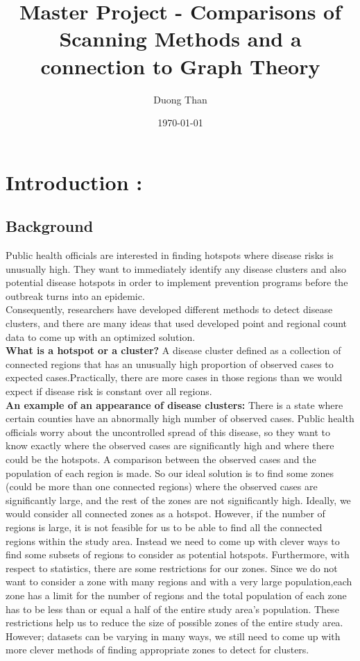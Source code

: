\documentclass[12pt]{article}
\title{Master Project - Comparisons of Scanning Methods and a connection to Graph Theory  }
\author{Duong Than}
\date{\today}
\begin{document}
\maketitle	
	
		\section{Introduction :} 
		\subsection{Background} 

			Public health officials are interested in finding hotspots where disease risks is unusually high. They want to immediately identify any disease clusters and also potential disease hotspots in order to implement prevention programs before the outbreak turns into an epidemic. \\ 		
			
			Consequently, researchers have developed different methods to detect disease clusters, and there are many ideas that used developed point and regional count data to come up with an optimized solution. \\
			
			\textbf{What is a hotspot or a cluster?} A disease cluster defined as a collection of connected regions that has an unusually high proportion of observed cases to expected cases.Practically, there are more cases in those regions than we would expect if disease risk is constant over all regions.\\
			
			\textbf{An example of an appearance of disease clusters:} There is a state where certain counties  have an abnormally high number of observed cases. Public health officials worry about the uncontrolled spread of this disease, so they want to know exactly where the observed cases are significantly high and where there could be the hotspots. A comparison between the observed cases and the population of each region is made. So our ideal solution is to find some zones (could be more than one connected regions) where the observed cases are significantly large, and the rest of the zones are not significantly high. Ideally, we would consider all connected zones as a hotspot. However, if the number of regions is large, it is not feasible for us to be able to find all the connected regions within the study area. Instead we need to come up with clever ways to find some  subsets of regions to consider as potential hotspots. Furthermore, with respect to statistics, there are some restrictions for our zones. Since we do not want to consider a zone with many regions and with a very large population,each zone has a limit for the number of regions and the total population of each zone has to be less than or equal a half of the entire study area's population. These restrictions help us to reduce the size of possible zones of the entire study area. However; datasets can be varying in many ways, we still need to come up with more clever methods of finding appropriate zones to detect for clusters. \\       
			
\end{document}
